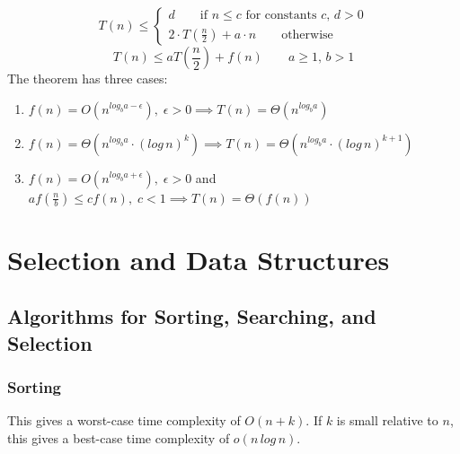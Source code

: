 \begin{equation}
    T(n) \leq 
    \begin{cases}
        d   \qquad \text{if } n \leq c \text{ for constants } c,\,d > 0 \\
        2 \cdot T(\frac{n}{2}) + a \cdot n  \qquad \text{otherwise}
    \end{cases}
\end{equation}
\begin{equation}
    T(n) \leq a T\left(\frac{n}{2}\right) + f(n) \quad\quad a \geq 1, \, b > 1
\end{equation}
The theorem has three cases:
\begin{enumerate}
    \item \(f(n) = O(n^{log_b a - \epsilon}), \; \epsilon > 0 \implies T(n) = \Theta(n^{log_b a})\)
    \item \(f(n) = \Theta(n^{log_b a} \cdot (log \, n)^k) \implies T(n) = \Theta(n^{log_b a} \cdot (log \, n)^{k+1})\)
    \item \(f(n) = O(n^{log_b a + \epsilon}), \; \epsilon > 0\) and \(a f(\frac{n}{b}) \leq c f(n), \; c < 1 \implies T(n) = \Theta(f(n))\)
\end{enumerate}

\section{Selection and Data Structures}\label{ads:section:3.sds}

\subsection{Algorithms for Sorting, Searching, and Selection}

\subsubsection{Sorting}

This gives a worst-case time complexity of \(O(n+k)\). If \(k\) is small relative to \(n\), this gives a best-case time complexity of \(o(n \, log \, n)\). 

